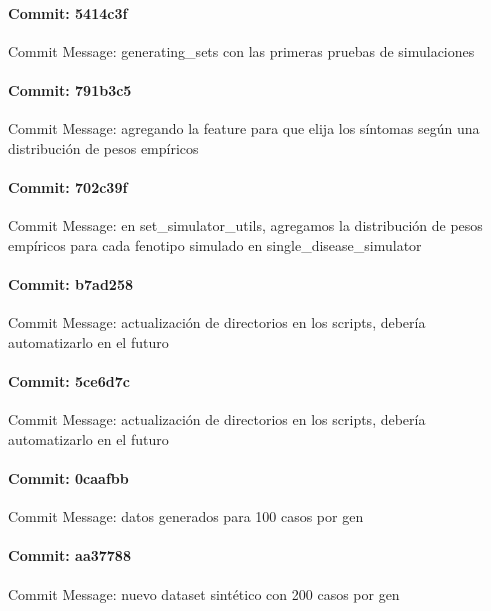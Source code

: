\documentclass{article}
\begin{document}
\paragraph{Commit: 5414c3f}
Commit Message: generating_sets con las primeras pruebas de simulaciones

\paragraph{Commit: 791b3c5}
Commit Message: agregando la feature para que elija los síntomas según una distribución de pesos empíricos

\paragraph{Commit: 702c39f}
Commit Message: en set_simulator_utils, agregamos la distribución de pesos empíricos para cada fenotipo simulado en single_disease_simulator

\paragraph{Commit: b7ad258}
Commit Message: actualización de directorios en los scripts, debería automatizarlo en el futuro

\paragraph{Commit: 5ce6d7c}
Commit Message: actualización de directorios en los scripts, debería automatizarlo en el futuro

\paragraph{Commit: 0caafbb}
Commit Message: datos generados para 100 casos por gen

\paragraph{Commit: aa37788}
Commit Message: nuevo dataset sintético con 200 casos por gen

\end{document}
